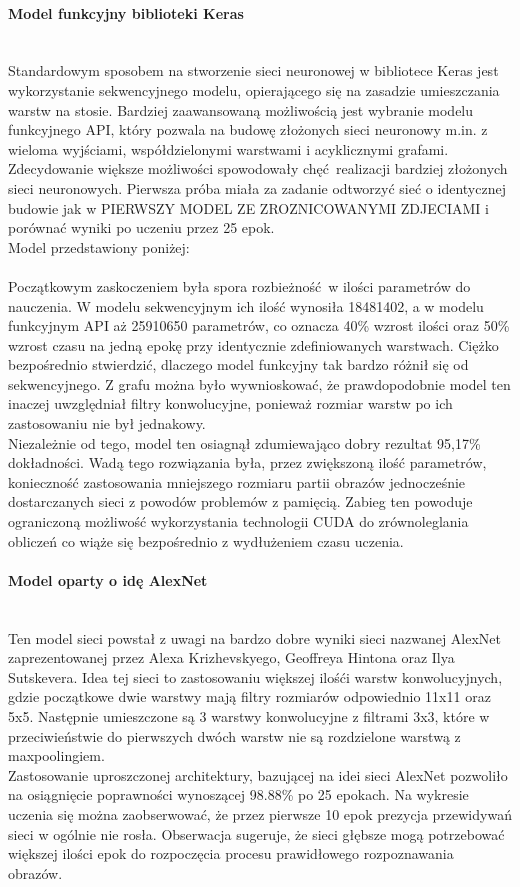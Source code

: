 \paragraph{Model funkcyjny biblioteki Keras} \mbox{}\\
Standardowym sposobem na stworzenie sieci neuronowej w bibliotece Keras jest
wykorzystanie sekwencyjnego modelu, opierającego się na zasadzie umieszczania
warstw na stosie. Bardziej zaawansowaną możliwością jest wybranie modelu funkcyjnego API,
który pozwala na budowę złożonych sieci neuronowy m.in. z wieloma wyjściami, współdzielonymi
warstwami i acyklicznymi grafami.\\
Zdecydowanie większe możliwości spowodowały chęć realizacji bardziej złożonych sieci
neuronowych. Pierwsza próba miała za zadanie odtworzyć sieć o identycznej budowie
jak w PIERWSZY MODEL ZE ZROZNICOWANYMI ZDJECIAMI i porównać wyniki po uczeniu przez
25 epok.\\
Model przedstawiony poniżej:\\\\
Początkowym zaskoczeniem była spora rozbieżność w ilości parametrów do nauczenia.
W modelu sekwencyjnym ich ilość wynosiła 18481402, a w modelu funkcyjnym API aż
25910650 parametrów, co oznacza 40\% wzrost ilości oraz 50\% wzrost czasu na jedną epokę
przy identycznie zdefiniowanych warstwach. Ciężko bezpośrednio stwierdzić, dlaczego
model funkcyjny tak bardzo różnił się od sekwencyjnego. Z grafu można było wywnioskować,
że prawdopodobnie model ten inaczej uwzględniał filtry konwolucyjne, ponieważ rozmiar
warstw po ich zastosowaniu nie był jednakowy.\\
Niezależnie od tego, model ten osiagnął zdumiewająco dobry rezultat 95,17\% dokładności.
Wadą tego rozwiązania była, przez zwiększoną ilość parametrów, konieczność zastosowania
mniejszego rozmiaru partii obrazów jednocześnie dostarczanych sieci z powodów
problemów z pamięcią. Zabieg ten powoduje ograniczoną możliwość wykorzystania
technologii CUDA do zrównoleglania obliczeń co wiąże się bezpośrednio z wydłużeniem
czasu uczenia.

\paragraph{Model oparty o idę AlexNet} \mbox{}\\
Ten model sieci powstał z uwagi na bardzo dobre wyniki sieci nazwanej AlexNet zaprezentowanej
przez Alexa Krizhevskyego, Geoffreya Hintona oraz Ilya Sutskevera. Idea tej sieci
to zastosowaniu większej ilośći warstw konwolucyjnych, gdzie początkowe dwie warstwy mają
filtry rozmiarów odpowiednio 11x11 oraz 5x5. Następnie umieszczone są 3 warstwy konwolucyjne
z filtrami 3x3, które w przeciwieństwie do pierwszych dwóch warstw nie są rozdzielone
warstwą z maxpoolingiem.\\
Zastosowanie uproszczonej architektury, bazującej na idei sieci AlexNet pozwoliło
na osiągnięcie poprawności wynoszącej 98.88\% po 25 epokach. Na wykresie uczenia się
można zaobserwować, że przez pierwsze 10 epok prezycja przewidywań sieci w ogólnie nie
rosła. Obserwacja sugeruje, że sieci głębsze mogą potrzebować większej ilości epok
do rozpoczęcia procesu prawidłowego rozpoznawania obrazów.

